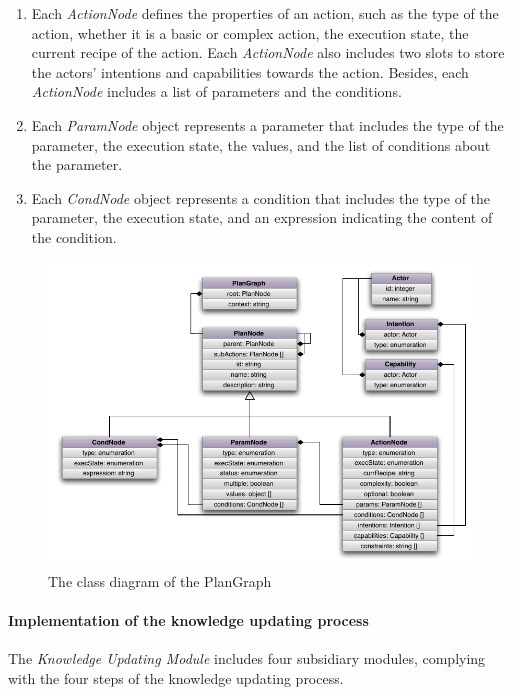 \begin{enumerate}
	\item Each \emph{ActionNode} defines the properties of an action, such as the type of the action, whether it is a basic or complex action, the execution state, the current recipe of the action. Each \emph{ActionNode} also includes two slots to store the actors' intentions and capabilities towards the action. Besides, each \emph{ActionNode} includes a list of parameters and the conditions.
	\item Each \emph{ParamNode} object represents a parameter that includes the type of the parameter, the execution state, the values, and the list of conditions about the parameter.
	\item Each \emph{CondNode} object represents a condition that includes the type of the parameter, the execution state, and an expression indicating the content of the condition.
\end{enumerate}
\begin{figure}[htbp] %
	\centering
	\includegraphics{pg_class_diagram.pdf} 
	\caption{The class diagram of the PlanGraph}
	\label{fig:pg_class_diagram}
\end{figure}

\paragraph*{Implementation of the knowledge updating process} %
\label{par:implementation_of_the_knowledge_updating_process}
The \emph{Knowledge Updating Module} includes four subsidiary modules, complying with the four steps of the knowledge updating process. 

